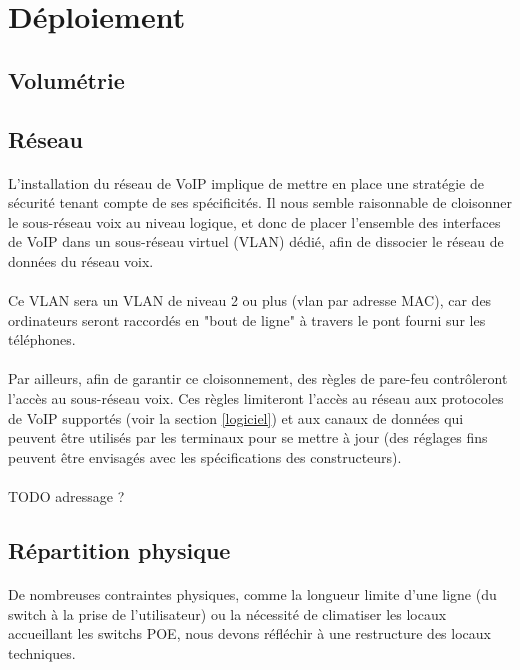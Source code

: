 \section{Déploiement}

\subsection{Volumétrie}

\subsection{Réseau}

\paragraph{} L'installation du réseau de VoIP implique de mettre en place une
stratégie de sécurité tenant compte de ses spécificités. Il nous semble
raisonnable de cloisonner le sous-réseau voix au niveau logique, et donc de
placer l'ensemble des interfaces de VoIP dans un sous-réseau virtuel (VLAN)
dédié, afin de dissocier le réseau de données du réseau voix.

\paragraph{} Ce VLAN sera un VLAN de niveau 2 ou plus (vlan par adresse MAC),
car des ordinateurs seront raccordés en "bout de ligne" à travers le pont fourni
sur les téléphones.

\paragraph{} Par ailleurs, afin de garantir ce cloisonnement, des règles de
pare-feu contrôleront l'accès au sous-réseau voix. Ces règles limiteront
l'accès au réseau aux protocoles de VoIP supportés (voir la section
\ref{logiciel}) et aux canaux de données qui peuvent être utilisés par les
terminaux pour se mettre à jour (des réglages fins peuvent être envisagés avec
les spécifications des constructeurs).

\paragraph{} TODO adressage ?

\subsection{Répartition physique}

\paragraph{} De nombreuses contraintes physiques, comme la longueur limite d'une
ligne (du switch à la prise de l'utilisateur) ou la nécessité de climatiser les
locaux accueillant les switchs \ac{POE}, nous devons réfléchir à une restructure
des locaux techniques.
